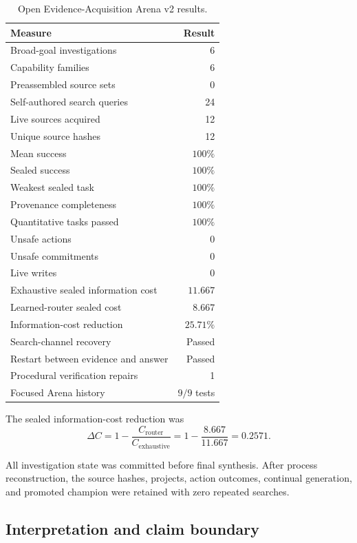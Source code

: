 \begin{table}[htbp]
\centering
\caption{Open Evidence-Acquisition Arena v2 results.}
\label{tab:arena-v2-results}
\begin{tabular}{lr}
\hline
Measure & Result \\
\hline
Broad-goal investigations & 6 \\
Capability families & 6 \\
Preassembled source sets & 0 \\
Self-authored search queries & 24 \\
Live sources acquired & 12 \\
Unique source hashes & 12 \\
Mean success & $100\%$ \\
Sealed success & $100\%$ \\
Weakest sealed task & $100\%$ \\
Provenance completeness & $100\%$ \\
Quantitative tasks passed & $100\%$ \\
Unsafe actions & 0 \\
Unsafe commitments & 0 \\
Live writes & 0 \\
Exhaustive sealed information cost & $11.667$ \\
Learned-router sealed cost & $8.667$ \\
Information-cost reduction & $25.71\%$ \\
Search-channel recovery & Passed \\
Restart between evidence and answer & Passed \\
Procedural verification repairs & 1 \\
Focused Arena history & $9/9$ tests \\
\hline
\end{tabular}
\end{table}

The sealed information-cost reduction was
\begin{equation}
\Delta C
=1-\frac{C_{\mathrm{router}}}{C_{\mathrm{exhaustive}}}
=1-\frac{8.667}{11.667}
=0.2571.
\label{eq:arena-v2-cost-reduction}
\end{equation}

All investigation state was committed before final synthesis.  After process
reconstruction, the source hashes, projects, action outcomes, continual
generation, and promoted champion were retained with zero repeated searches.


\subsection{Interpretation and claim boundary}
\label{subsec:arena-v2-boundary}


